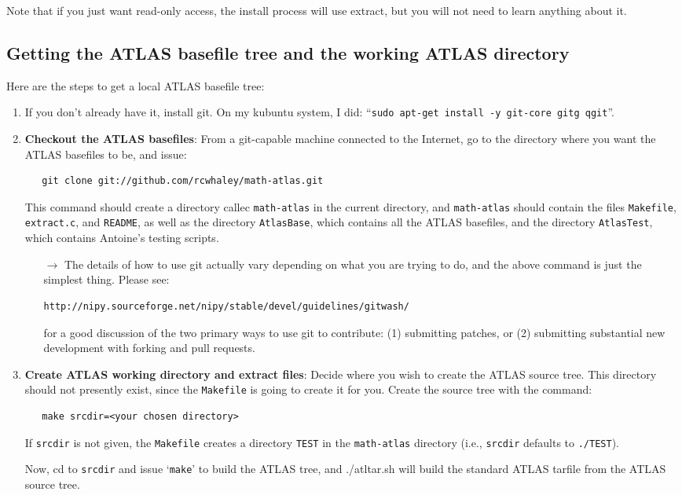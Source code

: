 \documentclass[11pt]{article}
\begin{document}
Note that if you just want read-only access, the install process will use
extract, but you will not need to learn anything about it.

\subsection{Getting the ATLAS basefile tree and the working ATLAS directory}
Here are the steps to get a local ATLAS basefile tree:
\begin{enumerate}
   \item If you don't already have it, install git.  On my kubuntu system,
         I did: ``\texttt{sudo apt-get install -y git-core gitg qgit}''.
       
\item {\bf Checkout the ATLAS basefiles}:
From a git-capable machine connected to the Internet, go to the directory
where you want the ATLAS basefiles to be, and issue:
\begin{verbatim}
   git clone git://github.com/rcwhaley/math-atlas.git
\end{verbatim}
This command should create a directory callec {\tt math-atlas} in the
current directory, and {\tt math-atlas} should contain the files
\texttt{Makefile}, \texttt{extract.c}, and \texttt{README},
as well as the directory \texttt{AtlasBase}, which contains all
the ATLAS basefiles, and the directory \texttt{AtlasTest},
which contains Antoine's testing scripts.
   \begin{itemize}
   \item [$\rightarrow$] The details of how to use git actually vary depending
      on what you are trying to do, and the above command is just the
      simplest thing.  Please see:
\begin{verbatim}
http://nipy.sourceforge.net/nipy/stable/devel/guidelines/gitwash/
\end{verbatim}
   for a good discussion of the two primary ways to use git to contribute:
   (1) submitting patches, or (2) submitting substantial new development
   with forking and pull requests.

   \end{itemize}

\item {\bf Create ATLAS working directory and extract files}:
Decide where you wish to create the ATLAS source tree.  This directory should
not presently exist, since the \texttt{Makefile} is going to create it for you.
Create the source tree with the command:
\begin{verbatim}
   make srcdir=<your chosen directory>
\end{verbatim}

If \texttt{srcdir} is not given, the \texttt{Makefile} creates a directory
\texttt{TEST} in the \texttt{math-atlas} directory (i.e., \texttt{srcdir}
defaults to \verb+./TEST+).

Now, cd to \texttt{srcdir} and issue `\texttt{make}' to build the ATLAS
tree, and {./atltar.sh} will build the standard ATLAS tarfile from the
ATLAS source tree.
\end{enumerate}
\end{document}

